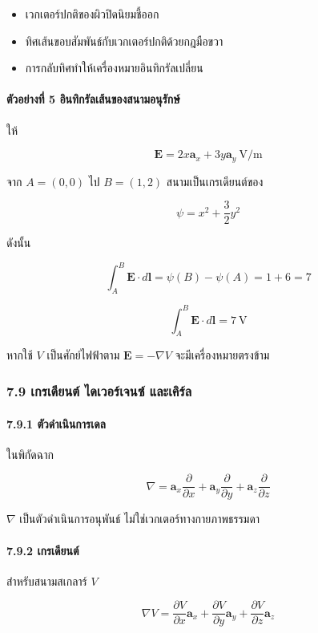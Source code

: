 \begin{itemize}
\item เวกเตอร์ปกติของผิวปิดนิยมชี้ออก
\item ทิศเส้นขอบสัมพันธ์กับเวกเตอร์ปกติด้วยกฎมือขวา
\item การกลับทิศทำให้เครื่องหมายอินทิกรัลเปลี่ยน
\end{itemize}

\paragraph{ตัวอย่างที่ 5 อินทิกรัลเส้นของสนามอนุรักษ์}

ให้

\[
\mathbf{E}=2x\mathbf{a}_x+3y\mathbf{a}_y\ \text{V/m}
\]

จาก \(A=(0,0)\) ไป \(B=(1,2)\) สนามเป็นเกรเดียนต์ของ

\[
\psi=x^2+\frac{3}{2}y^2
\]

ดังนั้น

\[
\int_A^B\mathbf{E}\cdot d\mathbf{l}
=\psi(B)-\psi(A)=1+6=7
\]

\[
\boxed{\int_A^B\mathbf{E}\cdot d\mathbf{l}=7\ \text{V}}
\]

หากใช้ \(V\) เป็นศักย์ไฟฟ้าตาม \(\mathbf{E}=-\nabla V\) จะมีเครื่องหมายตรงข้าม

\subsubsection{7.9 เกรเดียนต์ ไดเวอร์เจนซ์ และเคิร์ล}

\paragraph{7.9.1 ตัวดำเนินการเดล}

ในพิกัดฉาก

\[
\nabla=\mathbf{a}_x\frac{\partial}{\partial x}
+\mathbf{a}_y\frac{\partial}{\partial y}
+\mathbf{a}_z\frac{\partial}{\partial z}
\]

\(\nabla\) เป็นตัวดำเนินการอนุพันธ์ ไม่ใช่เวกเตอร์ทางกายภาพธรรมดา

\paragraph{7.9.2 เกรเดียนต์}

สำหรับสนามสเกลาร์ \(V\)

\[
\nabla V=
\frac{\partial V}{\partial x}\mathbf{a}_x+
\frac{\partial V}{\partial y}\mathbf{a}_y+
\frac{\partial V}{\partial z}\mathbf{a}_z
\]

